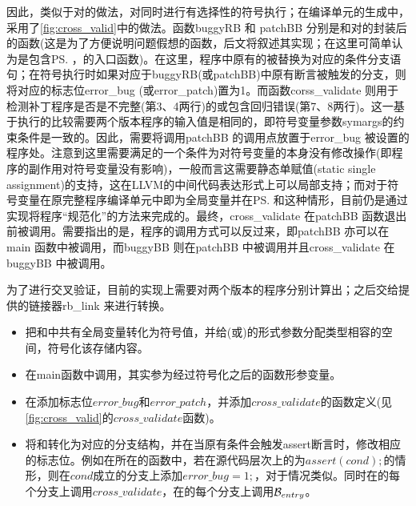 因此，类似于对\patch 的做法，\dryrun 对\bug 同时进行有选择性的符号执行；在编译单元的生成中，采用了\autoref{fig:cross_valid}中的做法。函数\textmd{buggyRB} 和 \textmd{patchBB} 分别是\bug 和\patch 对\rbscope 的封装后的函数(这是为了方便说明问题假想的函数，后文将叙述其实现；在这里可简单认为是包含\prog\ps ，\prog\bs 的入口函数\prog\entry )。在这里，程序\prog 中原有的\prog\ass 被替换为对应的条件分支语句；在符号执行时如果对应于buggyRB(或patchBB)中原有断言被触发的分支，则将对应的标志位\textmd{error\_bug} (或\textmd{error\_patch})置为1。而函数\textmd{corss\_validate} 则用于检测补丁程序是否是不完整(第3、4两行)的或包含回归错误(第7、8两行)。这一基于执行的比较需要两个版本程序的输入值是相同的，即符号变量参数\textmd{symargs}的约束条件是一致的。因此，需要将调用\textmd{patchBB} 的调用点放置于\textmd{error\_bug} 被设置的程序处。注意到这里需要满足的一个条件为对符号变量的本身没有修改操作(即程序的副作用对符号变量没有影响)，一般而言这需要静态单赋值(static single assignment)的支持，这在LLVM的中间代码表达形式上可以局部支持；而对于符号变量在原完整程序\prog 编译单元中即为全局变量并在\prog\ps 和\prog\bs 这种情形，目前仍是通过实现将程序“规范化”的方法来完成的。最终，\textmd{cross\_validate} 在\textmd{patchBB} 函数退出前被调用。需要指出的是，程序的调用方式可以反过来，即\textmd{patchBB} 亦可以在\textmd{main} 函数中被调用，而\textmd{buggyBB} 则在\textmd{patchBB} 中被调用并且\textmd{cross\_validate} 在\textmd{buggyBB} 中被调用。

为了进行交叉验证，目前的实现上\dryrun 需要对两个版本的程序分别计算出\rbscope ；之后交给\dryrun 提供的链接器rb\_link 来进行转换。
\begin{itemize}
  \item 把\bug\scope 和\patch\scope 中共有全局变量转化为符号值，并给\bug\entry (或\patch\entry )的形式参数分配类型相容的空间，符号化该存储内容。
  \item 在main函数中调用\bug\entry ，其实参为经过符号化之后的函数形参变量。
  \item 在添加标志位$error\_bug$和$error\_patch$，并添加$cross\_validate$的函数定义(见\autoref{fig:cross_valid}的$cross\_validate$函数)。
  \item 将\bug\ass 和\patch\ass 转化为对应的分支结构，并在当原有条件会触发assert断言时，修改相应的标志位。例如在\bug\ass 所在的函数中，若在源代码层次上的\bug\ass 为$assert(cond);$的情形，则在$cond$成立的分支上添加$error\_bug=1;$，对于\patch\ass 情况类似。同时在\patch\ass 的每个分支上调用$cross\_validate$，在\bug\ass 的每个分支上调用$\mathcal{B}_{entry}$。
\end{itemize}
  
